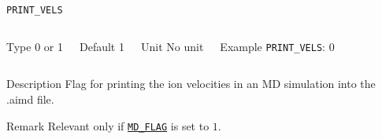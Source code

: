 \documentclass[xcolor=dvipsnames,t]{beamer}
\begin{document}
\begin{frame}[allowframebreaks]{\texttt{PRINT\_VELS}} \label{PRINT_VELS}
\vspace*{-12pt}
\begin{columns}
\begin{block}{Type}
0 or 1
\end{block}

\begin{block}{Default}
1
\end{block}

\begin{block}{Unit}
No unit
\end{block}

\begin{block}{Example}
\texttt{PRINT\_VELS}: 0
\end{block}
\end{columns}

\begin{block}{Description}
Flag for printing the ion velocities in an MD simulation into the .aimd file. 
\end{block}

\begin{block}{Remark}
Relevant only if \hyperlink{MD_FLAG}{\texttt{MD\_FLAG}} is set to $1$.
\end{block}

\end{frame}
\end{document}
